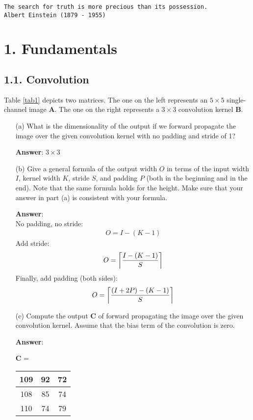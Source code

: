 \documentclass[12pt,letterpaper]{article}
\newcommand{\matr}[1]{\bm{#1}}     %
\DeclarePairedDelimiter\ceil{\lceil}{\rceil}
\begin{document}
\begin{center}
\texttt{The search for truth is more precious than its possession.\\  Albert Einstein (1879 - 1955)}
\end{center}

\section*{1. Fundamentals}
\subsection*{1.1. Convolution}
Table \ref{tab1} depicts two matrices. The one on the left represents an $5\times 5$ single-channel image $\matr{A}$. The one on the right
 represents a $3\times 3$ convolution kernel $\matr{B}$. 
\begin{itemize}
    \item[(a)] What is the dimensionality of the output if we forward propagate the image over the given convolution kernel with no padding and stride of 1? 
    
    \textbf{Answer}:
        $3\times 3$
    
    \item[(b)] Give a general formula of the output width $O$ in terms of the input width $I$, kernel width $K$, stride $S$, and padding $P$ (both in the beginning and in the end). Note that the same formula holds for the height. Make sure that your answer in part (a) is consistent with your formula. 
    
    \textbf{Answer}: \\
        No padding, no stride:
        \begin{align}
        O=I-(K-1)
        \end{align}
        Add stride:
        \begin{align}
        O=\ceil*{\frac{I-(K-1)}{S}}
        \end{align}
        Finally, add padding (both sides):
        \begin{align}
        O=\ceil*{\frac{(I+2P)-(K-1)}{S}}
        \end{align}
    
    \item[(c)] Compute the output $\matr{C}$ of forward propagating the image over the
given convolution kernel. Assume that the bias term of the convolution is zero.

    \textbf{Answer}: 
    \begin{table}[!ht]
        \centering
        $\matr{C}$ = \begin{tabular}{|c|c|c|} 
        \hline
           109 & 92 & 72 \\ \hline 
           108 & 85 & 74 \\ \hline
           110 & 74 & 79 \\ \hline 
        \end{tabular}
    \end{table}


\end{itemize}
\end{document}
